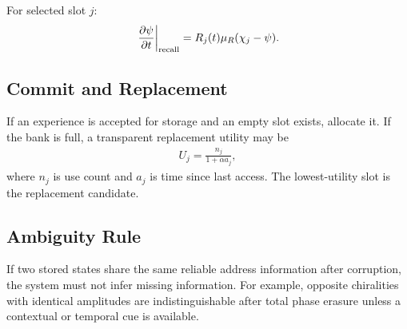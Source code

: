 For selected slot $j$:
\begin{align}
\left.\frac{\partial\psi}{\partial t}\right|_{\rm recall}
=
R_j(t)\mu_R(\chi_j-\psi).
\end{align}

\subsection{Commit and Replacement}

If an experience is accepted for storage and an empty slot exists, allocate it.
If the bank is full, a transparent replacement utility may be
\begin{align}
U_j
=
\frac{n_j}{1+\alpha a_j},
\end{align}
where $n_j$ is use count and $a_j$ is time since last access.
The lowest-utility slot is the replacement candidate.

\subsection{Ambiguity Rule}

If two stored states share the same reliable address information after corruption,
the system must not infer missing information.  For example, opposite chiralities
with identical amplitudes are indistinguishable after total phase erasure unless
a contextual or temporal cue is available.
